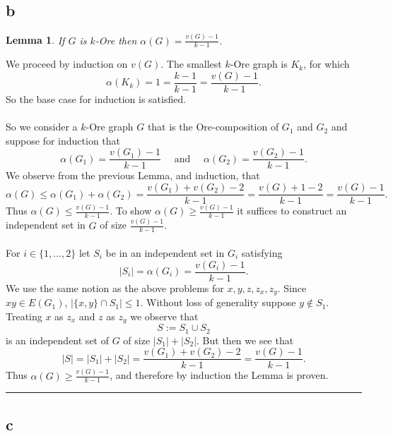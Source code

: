 \documentclass[letterpaper,12pt,oneside,onecolumn]{article}
\newenvironment{proof}{{\bf Proof:  }}{\hfill\rule{2mm}{2mm}}
\newtheorem{lemma}[fact]{Lemma}
\begin{document}
\subsection{b}
\begin{lemma}
	If $G$ is $k$-Ore then $\alpha(G) = \frac{v(G) - 1}{k-1}$.
\end{lemma}
\begin{proof}
	We proceed by induction on $v(G)$. The smallest $k$-Ore graph is $K_k$, for which
	$$\alpha(K_k) = 1 = \frac{k-1}{k-1} = \frac{v(G) -1}{k-1}.$$
	So the base case for induction is satisfied.
	\paragraph{}
	So we consider a $k$-Ore graph $G$ that is the Ore-composition of $G_1$ and $G_2$ and suppose for induction that
	$$\alpha(G_1) = \frac{v(G_1) - 1}{k-1} \quad\text{ and }\quad \alpha(G_2) = \frac{v(G_2) -1}{k-1}.$$
	We observe from the previous Lemma, and induction, that
	$$\alpha(G) \leq \alpha(G_1) + \alpha(G_2) = \frac{v(G_1) +v(G_2)- 2}{k-1} = \frac{v(G) + 1 - 2}{k-1} = \frac{v(G) - 1}{k-1}.$$
	Thus $\alpha(G) \leq \frac{v(G) - 1}{k-1}$. To show $\alpha(G) \geq \frac{v(G) - 1}{k-1}$ it suffices to construct an independent set in $G$ of size $\frac{v(G) - 1}{k-1}$.
	\paragraph{}
	For $i \in \{1, \dots, 2\}$ let $S_i$ be in an independent set in $G_i$ satisfying $$|S_i| = \alpha(G_i) = \frac{v(G_i) - 1}{k-1}.$$ We use the same notion as the above problems for $x,y, z, z_x, z_y$. Since $xy \in E(G_1)$, $|\{x,y\} \cap S_1| \leq 1$. Without loss of generality suppose $y \not\in S_1$. Treating $x$ as $z_x$ and $z$ as $z_y$ we observe that
	$$S := S_1 \cup S_2$$
	is an independent set of $G$ of size $|S_1| + |S_2|$. But then we see that
	$$|S| = |S_1| + |S_2| =  \frac{v(G_1) +v(G_2)- 2}{k-1} = \frac{v(G) - 1}{k-1}.$$
	Thus $\alpha(G) \geq \frac{v(G) - 1}{k-1}$, and therefore by induction the Lemma is proven.
\end{proof}

\subsection{c}
\end{document}

